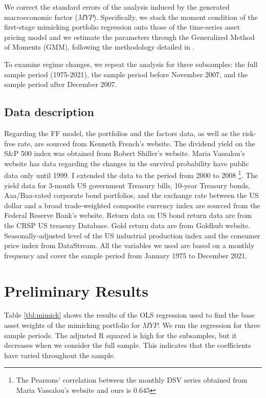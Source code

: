\documentclass[11pt,halfline,a4paper]{ouparticle}
\begin{document}
We correct the standard errors of the analysis induced by the generated macroeconomic factor ($MYP$). Specifically, we stack the moment condition of the first-stage mimicking portfolio regression onto those of the time-series asset pricing model and we estimate the parameters through the Generalized Method of Moments (GMM), following the methodology detailed in \cite{vassalou2003news}.


To examine regime changes, we repeat the analysis for three subsamples: the full sample period (1975-2021), the sample period before November 2007, and the sample period after December 2007. 



\subsection{Data description}
\label{data}

Regarding the FF model, the portfolios and the factors data, as well as the risk-free rate, are sourced from Kenneth French's website. The dividend yield on the S\&P 500 index was obtained from Robert Shiller's website. Maria Vassalou's website has data regarding the changes in the survival probability have public data only until 1999. I extended the data to the period from 2000 to 2008 \footnote{The Pearsons' correlation between the monthly DSV series obtained from Maria Vassalou’s website and ours is $0.645$}. The yield data for 3-month US government Treasury bills, 10-year Treasury bonds, Aaa/Baa-rated corporate bond portfolios, and the exchange rate between the US dollar and a broad trade-weighted composite currency index are sourced from the Federal Reserve Bank's website. Return data on US bond return data are from the CRSP US treasury Database. Gold return data are from Goldhub website. Seasonally-adjusted level of the US industrial production index and the consumer price index from DataStream. All the variables we used are based on a monthly frequency and cover the sample period from January 1975 to December 2021.


\section{Preliminary Results}
\label{results}

Table \ref{tbl:mimick} shows the results of the OLS regression used to find the base asset weights of the mimicking portfolio for $MYP$. We run the regression for three sample periods. The adjusted R squared is high for the subsamples, but it decreases when we consider the full sample. This indicates that the coefficients have varied throughout the sample.
\end{document}
